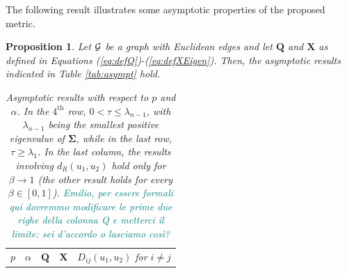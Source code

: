 \documentclass[12pt]{article}
\theoremstyle{plain}
\newtheorem{proposition}{Proposition}
\theoremstyle{remark}
\newcommand{\latMatr}[1]{\mathbf{#1}}          %
\newcommand{\grMatr}[1]{{\boldsymbol{#1}}}   %
\newcommand{\tobi}[1]{\textcolor{teal}{#1}}
\begin{document}
    
    The following result illustrates some %
    asymptotic properties of the proposed metric. %
    \begin{proposition}
        \label{prop:asymptoticResults}
        Let ${\cal G}$ be a graph with Euclidean edges and let $\latMatr{Q}$ and ${\latMatr{X}}$ as defined in Equations (\ref{eq:defQ})-(\ref{eq:defXEigen}). Then, the asymptotic results {indicated in Table \ref{tab:asympt}} hold.\par %
        \begin{table}
            \caption{Asymptotic results with respect to $p$ and $\alpha$. In the $4^\text{th}$ row, $0<\tau \leq \lambda_{n-1}$, with $\lambda_{n-1}$ being the smallest positive eigenvalue of $\grMatr{\Sigma}$, while in the last row, $\tau \geq \lambda_1$. In the last column, the results involving $d_R(u_1,u_2)$ hold only for $\beta \to 1$ (the other result holds for every $\beta\in[0,1]$). \tobi{Emilio, per essere formali qui dovremmo modificare le prime due righe della colonna Q e metterci il limite: sei d'accordo o lasciamo così?}}
            \renewcommand{\arraystretch}{1.2}
            \begin{center}
                \begin{tabular}{|c|c|c|c|c|}
                    \hline
                    $p$ & $\alpha$ & $\latMatr{Q}$ & ${\latMatr{X}}$ & $D_{ij}(u_1,u_2)$ for $i\ne j$\\

\end{tabular}
\end{center}
\end{table}
\end{proposition}
\end{document}
